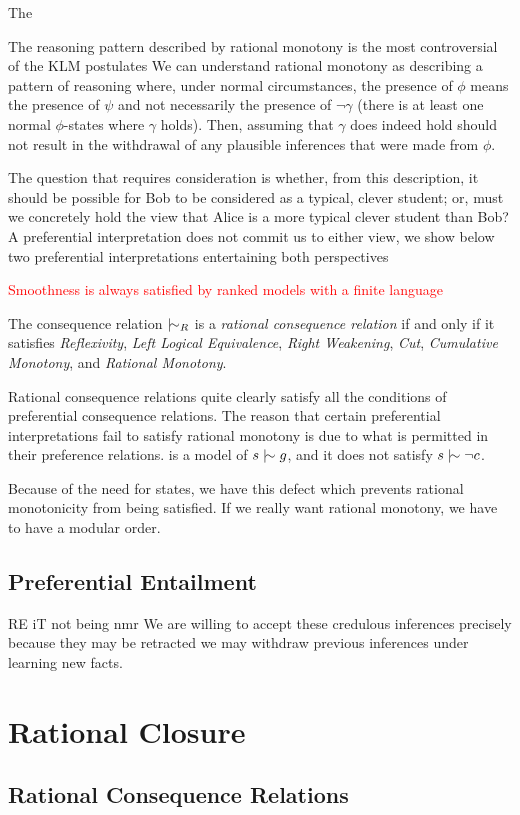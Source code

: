 The

\clearpage
The reasoning pattern described by rational monotony is the most controversial of the KLM postulates We can understand
rational monotony as describing a pattern of reasoning where, under normal circumstances, the presence of $\phi$ means
the presence of $\psi$ and not necessarily the presence of $\neg \gamma$ (there is at least one normal $\phi$-states where
$\gamma$ holds). Then, assuming that $\gamma$ does indeed hold should not result in the withdrawal of any plausible
inferences that were made from $\phi$.

The question that requires consideration is whether, from this description, it should be possible for Bob to be
considered as a typical, clever student; or, must we concretely hold the view that Alice is a more typical clever student
than Bob? A preferential interpretation does not commit us to either view, we show below two preferential interpretations
entertaining both perspectives

\textcolor{red}{Smoothness is always satisfied by ranked models with a finite language}

\begin{definition}
	\label{definition:rational-consequence-relation} 

	The consequence relation $\twiddle_{R}$ is a \emph{rational consequence relation} if and only if it satisfies \textit{Reflexivity},
	\textit{Left Logical Equivalence}, \textit{Right Weakening}, \textit{Cut}, \textit{Cumulative Monotony}, and \textit{Rational
	Monotony}.
\end{definition}

Rational consequence relations quite clearly satisfy all the conditions of preferential consequence relations. The
reason that certain preferential interpretations fail to satisfy rational monotony is due to what is permitted in their
preference relations.  is a model of $s \twiddle g$, and it does not satisfy
$s \twiddle \neg c$.

Because of the need for states, we have this defect which prevents rational monotonicity from being satisfied. If we
really want rational monotony, we have to have a modular order.

\subsection{Preferential Entailment}

RE iT not being nmr We are willing to accept these credulous inferences precisely because they may be retracted we may
withdraw previous inferences under learning new facts.

\section{Rational Closure}

\subsection{Rational Consequence Relations}